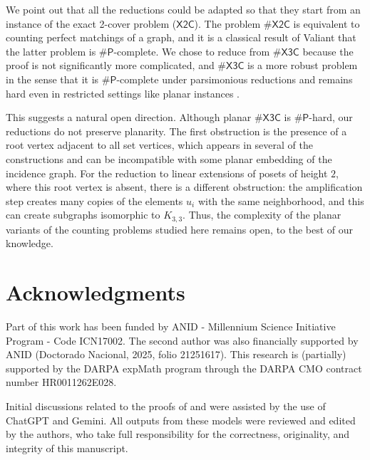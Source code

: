 \documentclass[11pt]{amsart}
\begin{document}
We point out that all the reductions could be adapted so that they start from an instance of the exact 2-cover problem ($\mathsf{X2C}$). The problem $\#\mathsf{X2C}$ is equivalent to counting perfect matchings of a graph, and it is a classical result of Valiant \cite{V79} that the latter problem is $\#\mathsf{P}$-complete. We chose to reduce from $\#\mathsf{X3C}$ because the proof is not significantly more complicated, and $\#\mathsf{X3C}$ is a more robust problem in the sense that it is $\#\mathsf{P}$-complete under parsimonious reductions and remains hard even in restricted settings like planar instances \cite{X3C}.

This suggests a natural open direction. Although planar $\#\mathsf{X3C}$ is $\#\mathsf{P}$-hard, our reductions do not preserve planarity. The first obstruction is the presence of a root vertex adjacent to all set vertices, which appears in several of the constructions and can be incompatible with some planar embedding of the incidence graph. For the reduction to linear extensions of posets of height $2$, where this root vertex is absent, there is a different obstruction: the amplification step creates many copies of the elements $u_i$ with the same neighborhood, and this can create subgraphs isomorphic to $K_{3, 3}$. Thus, the complexity of the planar variants of the counting problems studied here remains open, to the best of our knowledge.

\section*{Acknowledgments}
Part of this work has been funded by ANID - Millennium Science Initiative Program -
Code ICN17002. 
The second author was also financially supported by ANID (Doctorado Nacional, 2025, folio 21251617). This research is (partially) supported by the DARPA expMath program
through the DARPA CMO contract number HR0011262E028.

Initial discussions related to the proofs of  and  were assisted by the use of ChatGPT and Gemini. All outputs from these models were reviewed and edited by the authors, who take full responsibility for the correctness, originality, and integrity of this manuscript.






\appendix
\end{document}
